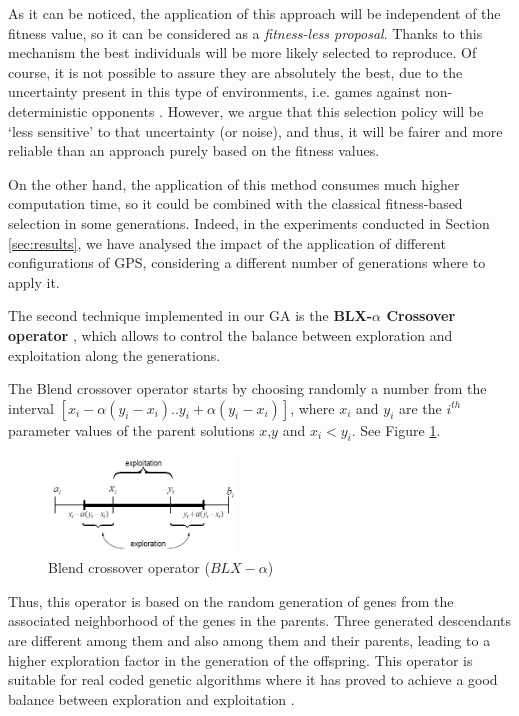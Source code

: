 \documentclass[10pt,journal,compsoc]{IEEEtran}
\begin{document}
As it can be noticed, the application of this approach will be independent of the fitness value, so it can be considered as a \textit{fitness-less proposal}.
Thanks to this mechanism the best individuals will be more likely selected to reproduce. Of course, it is not possible to assure they are absolutely the best, due to the uncertainty present in this type of environments, i.e. games against non-deterministic opponents \cite{merelo2016statistical}. However, we argue that this selection policy will be `less sensitive' to that uncertainty (or noise), and thus, it will be fairer and more reliable than an approach purely based on the fitness values. 

On the other hand, the application of this method consumes much higher computation time, so it could be combined with the classical fitness-based selection in some generations. Indeed, in the experiments conducted in Section \ref{sec:results}, we have analysed the impact of the application of different configurations of GPS, considering a different number of generations where to apply it.

The second technique implemented in our GA is the \textbf{BLX-$\alpha$ Crossover operator} \cite{blx2008}, which allows to control the balance between exploration and exploitation along the generations.

The Blend crossover operator starts by choosing randomly a number from the interval $[x_i-\alpha(y_i-x_i).. y_i+\alpha(y_i-x_i)]$, where $x_i$ and $y_i$ are the $i^{th}$ parameter values of the parent solutions $x$,$y$ and $x_i < y_i$. See Figure \ref{fig:blxalpha}.

 \begin{figure}[!ht]	
 	\begin{center}
 		\includegraphics[width=5cm]{fig/blxalpha.jpg}
 		\caption{Blend crossover operator ($BLX-\alpha$)}
 		\label{fig:blxalpha}	
 	\end{center}	
 \end{figure}

Thus, this operator is based on the random generation of genes from the associated neighborhood of the genes in the parents. Three generated descendants are different among them and also among them and their parents, leading to a higher exploration factor in the generation of the offspring.
This operator is suitable for real coded genetic algorithms where it has proved to achieve a good balance between exploration and exploitation \cite{blx2008}.
\end{document}
